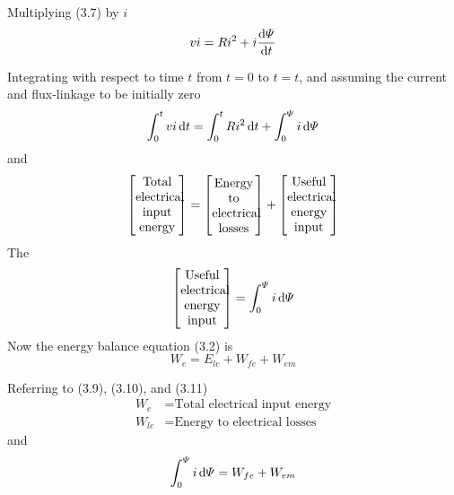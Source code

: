 \documentclass[a4paper,numbers=noenddot,12pt]{scrbook}
\begin{document}
            Multiplying (3.7) by $i$
            \begin{equation}
                vi = Ri^2 + i \dfrac{\dif \varPsi}{\dif t}
                \label{eq:Eq3.8}
            \end{equation}

            Integrating with respect to time $t$ from $t = 0$ to $t = t$, and assuming the current and flux-linkage to be initially zero
            \begin{equation}
                \int_0^t vi \dif t = \int_0^t Ri^2 \dif t + \int_0^{\varPsi} i \dif \varPsi
                \label{eq:Eq3.9}
            \end{equation}
            and
            \begin{equation}
                \left[
                    \parbox{8ex}{\centering Total \\ electrical \\ input \\ energy}
                \right]
                =
                \left[
                    \parbox{8ex}{\centering Energy \\ to \\ electrical \\ losses}
                \right]
                +
                \left[
                    \parbox{8ex}{\centering Useful \\ electrical \\ energy \\ input}
                \right]
                \label{eq:Eq3.10}
            \end{equation}
            The
            \begin{equation}
                \left[
                    \parbox{8ex}{\centering Useful \\ electrical \\ energy \\ input}
                \right]
                =
                \int_0^{\varPsi} i \dif \varPsi
                \label{eq:Eq3.11}
            \end{equation}
            Now the energy balance equation (3.2) is
            \begin{equation*}
                W_e = E_{le} + W_{fe} + W_{em}
            \end{equation*}

            Referring to (3.9), (3.10), and (3.11)
            \begin{align*}
                W_e & = \text{Total electrical input energy}\\
                W_{le} & = \text{Energy to electrical losses}
            \end{align*}
            and
            \begin{equation}
                \int_0^{\varPsi} i \dif \varPsi = W_{fe} + W_{em}
                \label{eq:Eq3.12}
            \end{equation}
\end{document}
